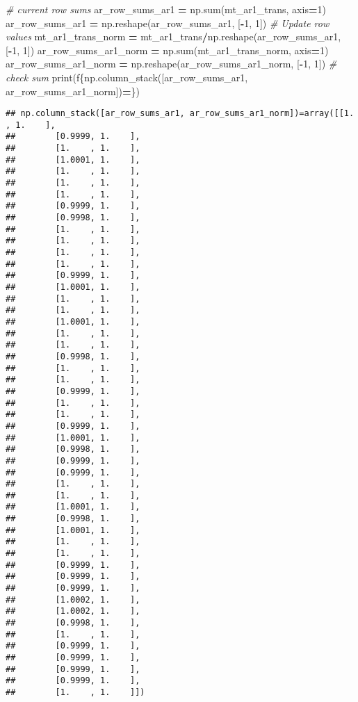 \documentclass[
]{book}
\newenvironment{Shaded}{\begin{snugshade}}{\end{snugshade}}
\newcommand{\BuiltInTok}[1]{#1}
\newcommand{\CommentTok}[1]{\textcolor[rgb]{0.56,0.35,0.01}{\textit{#1}}}
\newcommand{\DecValTok}[1]{\textcolor[rgb]{0.00,0.00,0.81}{#1}}
\newcommand{\NormalTok}[1]{#1}
\newcommand{\OperatorTok}[1]{\textcolor[rgb]{0.81,0.36,0.00}{\textbf{#1}}}
\newcommand{\SpecialCharTok}[1]{\textcolor[rgb]{0.00,0.00,0.00}{#1}}
\newcommand{\SpecialStringTok}[1]{\textcolor[rgb]{0.31,0.60,0.02}{#1}}
\begin{document}
\begin{Shaded}
\begin{Highlighting}[]
\CommentTok{\# current row sums}
\NormalTok{ar\_row\_sums\_ar1 }\OperatorTok{=}\NormalTok{ np.}\BuiltInTok{sum}\NormalTok{(mt\_ar1\_trans, axis}\OperatorTok{=}\DecValTok{1}\NormalTok{)}
\NormalTok{ar\_row\_sums\_ar1 }\OperatorTok{=}\NormalTok{ np.reshape(ar\_row\_sums\_ar1, [}\OperatorTok{{-}}\DecValTok{1}\NormalTok{, }\DecValTok{1}\NormalTok{])}
\CommentTok{\# Update row values}
\NormalTok{mt\_ar1\_trans\_norm }\OperatorTok{=}\NormalTok{ mt\_ar1\_trans}\OperatorTok{/}\NormalTok{np.reshape(ar\_row\_sums\_ar1, [}\OperatorTok{{-}}\DecValTok{1}\NormalTok{, }\DecValTok{1}\NormalTok{])}
\NormalTok{ar\_row\_sums\_ar1\_norm }\OperatorTok{=}\NormalTok{ np.}\BuiltInTok{sum}\NormalTok{(mt\_ar1\_trans\_norm, axis}\OperatorTok{=}\DecValTok{1}\NormalTok{)}
\NormalTok{ar\_row\_sums\_ar1\_norm }\OperatorTok{=}\NormalTok{ np.reshape(ar\_row\_sums\_ar1\_norm, [}\OperatorTok{{-}}\DecValTok{1}\NormalTok{, }\DecValTok{1}\NormalTok{])}
\CommentTok{\# check sum}
\BuiltInTok{print}\NormalTok{(}\SpecialStringTok{f\textquotesingle{}}\SpecialCharTok{\{np.}\NormalTok{column\_stack([ar\_row\_sums\_ar1, ar\_row\_sums\_ar1\_norm])}\OperatorTok{=}\SpecialCharTok{\}}\SpecialStringTok{\textquotesingle{}}\NormalTok{)}
\end{Highlighting}
\end{Shaded}

\begin{verbatim}
## np.column_stack([ar_row_sums_ar1, ar_row_sums_ar1_norm])=array([[1.    , 1.    ],
##        [0.9999, 1.    ],
##        [1.    , 1.    ],
##        [1.0001, 1.    ],
##        [1.    , 1.    ],
##        [1.    , 1.    ],
##        [1.    , 1.    ],
##        [0.9999, 1.    ],
##        [0.9998, 1.    ],
##        [1.    , 1.    ],
##        [1.    , 1.    ],
##        [1.    , 1.    ],
##        [1.    , 1.    ],
##        [0.9999, 1.    ],
##        [1.0001, 1.    ],
##        [1.    , 1.    ],
##        [1.    , 1.    ],
##        [1.0001, 1.    ],
##        [1.    , 1.    ],
##        [1.    , 1.    ],
##        [0.9998, 1.    ],
##        [1.    , 1.    ],
##        [1.    , 1.    ],
##        [0.9999, 1.    ],
##        [1.    , 1.    ],
##        [1.    , 1.    ],
##        [0.9999, 1.    ],
##        [1.0001, 1.    ],
##        [0.9998, 1.    ],
##        [0.9999, 1.    ],
##        [0.9999, 1.    ],
##        [1.    , 1.    ],
##        [1.    , 1.    ],
##        [1.0001, 1.    ],
##        [0.9998, 1.    ],
##        [1.0001, 1.    ],
##        [1.    , 1.    ],
##        [1.    , 1.    ],
##        [0.9999, 1.    ],
##        [0.9999, 1.    ],
##        [0.9999, 1.    ],
##        [1.0002, 1.    ],
##        [1.0002, 1.    ],
##        [0.9998, 1.    ],
##        [1.    , 1.    ],
##        [0.9999, 1.    ],
##        [0.9999, 1.    ],
##        [0.9999, 1.    ],
##        [0.9999, 1.    ],
##        [1.    , 1.    ]])
\end{verbatim}
\end{document}

